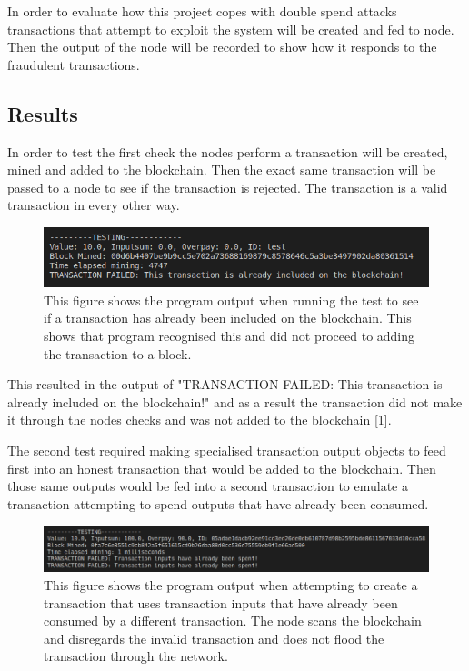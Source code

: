 \documentclass{l4proj}
\begin{document}
In order to evaluate how this project copes with double spend attacks transactions that attempt to exploit the system
will be created and fed to node. Then the output of the node will be recorded to show how it responds to the fraudulent
transactions.



\subsection{Results}
In order to test the first check the nodes perform a transaction will be created, mined and added to the blockchain.
Then the exact same transaction will be passed to a node to see if the transaction is rejected. The transaction is
a valid transaction in every other way.

\begin{figure}[!ht]
    \centering
    \includegraphics[width=1\linewidth]{images/check1.png}    
    \caption
    {
        This figure shows the program output when running the test to see if a transaction has already been included
        on the blockchain. This shows that program recognised this and did not proceed to adding the transaction to a 
        block.
    }
    \label{fig:check1} 
\end{figure}

This resulted in the output of "TRANSACTION FAILED: This transaction is already included on the blockchain!" and as
a result the transaction did not make it through the nodes checks and was not added to the blockchain [\ref{fig:check1}].

The second test required making specialised transaction output objects to feed first into an honest transaction that
would be added to the blockchain. Then those same outputs would be fed into a second transaction to emulate a
transaction attempting to spend outputs that have already been consumed.

\begin{figure}[!ht]
    \centering
    \includegraphics[width=1\linewidth]{images/inputsspent.png}    
    \caption
    {
        This figure shows the program output when attempting to create a transaction that uses transaction inputs
        that have already been consumed by a different transaction. The node scans the blockchain and disregards the
        invalid transaction and does not flood the transaction through the network.
    }
    \label{fig:inputsspent}
\end{figure}
\end{document}
